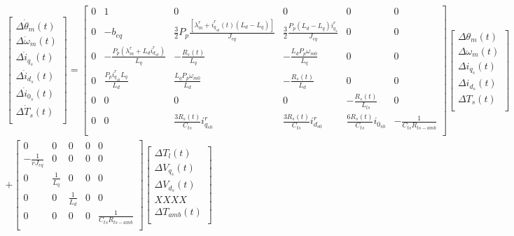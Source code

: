 \documentclass{article}
\begin{document}
\begin{multline}
    \begin{bmatrix}
        \Delta\dot{\theta}_{m}(t)\\
        \Delta\dot{\omega}_{m}(t)\\
        \Delta\dot{i}_{q_{s}}(t)\\
        \Delta\dot{i}_{d_{s}}(t)\\
        \Delta\dot{i}_{0_{s}}(t)\\
        \Delta\dot{T}_{s}(t)\\
    \end{bmatrix} =
    \begin{bmatrix}
        0 & 1 & 0 & 0 & 0  & 0 \\
        0 & -b_{eq} & \frac{3}{2}P_{p}\frac{[\lambda_{m}^r + i_{q_{s0}}^r(t)(L_{d}-L_{q})]}{J_{eq}} & \frac{3}{2}\frac{P_{p}(L_{d}-L_{q})i_{q_{s}}^r}{J_{eq}} & 0 & 0\\
        0 & -\frac{P_{p}(\lambda_{m}^r + L_{d}i_{d_{s0}}^r)}{L_{q}} & -\frac{R_{s}(t)}{L_{q}} & -\frac{L_{d}P_{p}\omega_{m0}}{L_{q}} & 0 & 0\\
        0 & \frac{P_{p}i_{q_{s0}}^r L_{q}}{L_{d}} & \frac{L_{q}P_{p}\omega_{m0}}{L_{d}} & -\frac{R_{s}(t)}{L_{d}} & 0 & 0\\
        0 & 0 & 0 & 0 & -\frac{R_{s}(t)}{L_{ls}} & 0\\
        0 & 0 & \frac{3R_{s}(t)}{C_{ts}}i_{q_{s0}}^r & \frac{3R_{s}(t)}{C_{ts}}i_{d_{s0}}^r & \frac{6R_{s}(t)}{C_{ts}}i_{0_{s0}} & -\frac{1}{C_{ts}R_{ts-amb}}\\
    \end{bmatrix}
    \begin{bmatrix}
        \Delta{\theta}_{m}(t)\\
        \Delta{\omega}_{m}(t)\\
        \Delta{i}_{q_{s}}(t)\\
        \Delta{i}_{d_{s}}(t)\\
        \Delta{T}_{s}(t)\\
    \end{bmatrix}\\  + 
    \begin{bmatrix}
        0 & 0 & 0 & 0 & 0\\
        -\frac{1}{rJ_{eq}} & 0 & 0 & 0 & 0\\
        0 & \frac{1}{L_{q}} & 0 & 0 & 0\\
        0 & 0 & \frac{1}{L_{d}} & 0 & 0\\
        0 & 0 & 0 & 0 & \frac{1}{C_{ts}R_{ts-amb}}\\
    \end{bmatrix}
    \begin{bmatrix}
        \Delta{T}_{l}(t)\\
        \Delta{V}_{q_{s}}(t)\\
        \Delta{V}_{d_{s}}(t)\\
        XXXX\\
        \Delta T_{amb}(t)\\
    \end{bmatrix} 
\end{multline}
\end{document}
